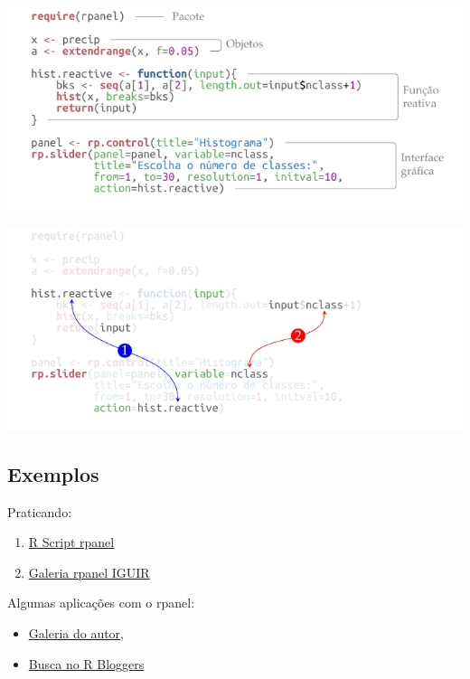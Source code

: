\begin{frame}
\includegraphics[scale=1]{./tikz/hist_slider_rpanel-1.pdf}
\end{frame}

\begin{frame}
\includegraphics[scale=1]{./tikz/hist_slider_rpanel-2.pdf}
\end{frame}


\subsection*{Exemplos}

\begin{frame}
 Praticando:
  
  \begin{enumerate}
    \itemsep1pt\parskip0pt
  \item
    \href{run:./R/rpanel/rpanel.R}{R Script rpanel}
  \item 
	\href{run:rpanel.html}{Galeria rpanel IGUIR}
  \end{enumerate}

  Algumas aplicações com o rpanel:
  \begin{itemize}
    \itemsep1pt\parskip0pt
  \item \href{http://www.stats.gla.ac.uk/~adrian/rpanel/}{Galeria
      do autor},
  \item \href{http://www.r-bloggers.com/?s=rpanel}{Busca no R
      Bloggers}
  \end{itemize}

\end{frame}
